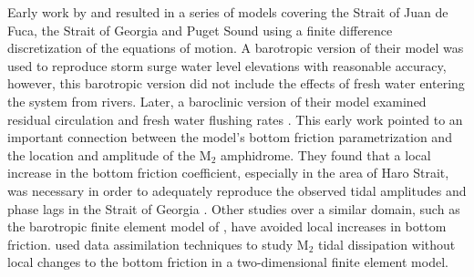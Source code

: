\documentclass[pdftex,10pt]{article}
\begin{document}
Early work by \citet{crean1988mathematical,crean1988numerical} and \citet{stronach1993update} resulted in a series of models covering the Strait of Juan de Fuca, the Strait of Georgia and Puget Sound using a finite difference discretization of the equations of motion. A barotropic version of their model was used to reproduce storm surge water level elevations with reasonable accuracy, however, this barotropic version did not include the effects of fresh water entering the system from rivers. Later, a baroclinic version of their model examined residual circulation and fresh water flushing rates \citep{stronach1993update, marinone1996model}. This early work pointed to an important connection between the model's bottom friction parametrization and the location and amplitude of the M$_2$ amphidrome. They found that a local increase in the bottom friction coefficient, especially in the area of Haro Strait, was necessary in order to adequately reproduce the observed tidal amplitudes and phase lags in the Strait of Georgia \citep{stronach1993update}. Other studies over a similar domain, such as the barotropic finite element model of \citet{foreman1995tidal}, have avoided local increases in bottom friction. \citet{foreman2004m} used data assimilation techniques to study M$_2$ tidal dissipation without local changes to the bottom friction in a two-dimensional finite element model. 
\end{document}
